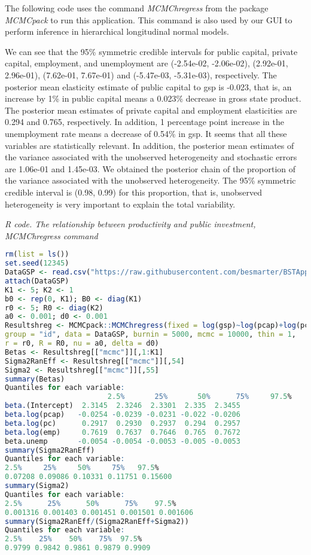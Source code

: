 The following code uses the command \textit{MCMChregress} from the package \textit{MCMCpack} to run this application. This command is also used by our GUI to perform inference in hierarchical longitudinal normal models.

We can see that the 95\% symmetric credible intervals for public capital, private capital, employment, and unemployment are (-2.54e-02, -2.06e-02), (2.92e-01, 2.96e-01), (7.62e-01, 7.67e-01) and (-5.47e-03, -5.31e-03), respectively. The posterior mean elasticity estimate of public capital to gsp is -0.023, that is, an increase by 1\% in public capital means a 0.023\% decrease in gross state product. The posterior mean estimates of private capital and employment elasticities are 0.294 and 0.765, respectively. In addition, 1 percentage point increase in the unemployment rate means a decrease of 0.54\% in gsp. It seems that all these variables are statistically relevant. In addition, the posterior mean estimates of the variance associated with the unobserved heterogeneity and stochastic errors are 1.06e-01 and 1.45e-03. We obtained the posterior chain of the proportion of the variance associated with the unobserved heterogeneity. The 95\% symmetric credible interval is (0.98, 0.99) for this proportion, that is, unobserved heterogeneity is very important to explain the total variability.

\begin{tcolorbox}[enhanced,width=4.67in,center upper,
	fontupper=\large\bfseries,drop shadow southwest,sharp corners]
	\textit{R code. The relationship between productivity and public investment, MCMChregress command}
	\begin{VF}
		\begin{lstlisting}[language=R]
rm(list = ls())
set.seed(12345)
DataGSP <- read.csv("https://raw.githubusercontent.com/besmarter/BSTApp/refs/heads/master/DataApp/8PublicCap.csv", sep = ",", header = TRUE, quote = "")
attach(DataGSP)
K1 <- 5; K2 <- 1
b0 <- rep(0, K1); B0 <- diag(K1)
r0 <- 5; R0 <- diag(K2)
a0 <- 0.001; d0 <- 0.001
Resultshreg <- MCMCpack::MCMChregress(fixed = log(gsp)~log(pcap)+log(pc)+log(emp)+unemp, random = ~1, 
group = "id", data = DataGSP, burnin = 5000, mcmc = 10000, thin = 1,
r = r0, R = R0, nu = a0, delta = d0)
Betas <- Resultshreg[["mcmc"]][,1:K1]
Sigma2RanEff <- Resultshreg[["mcmc"]][,54]
Sigma2 <- Resultshreg[["mcmc"]][,55]
summary(Betas)
Quantiles for each variable:
						2.5%       25%       50%      75%     97.5%
beta.(Intercept)  2.3145  2.3246  2.3301  2.335  2.3455
beta.log(pcap)   -0.0254 -0.0239 -0.0231 -0.022 -0.0206
beta.log(pc)      0.2917  0.2930  0.2937  0.294  0.2957
beta.log(emp)     0.7619  0.7637  0.7646  0.765  0.7672
beta.unemp       -0.0054 -0.0054 -0.0053 -0.005 -0.0053
summary(Sigma2RanEff)
Quantiles for each variable:
2.5%     25%     50%     75%   97.5% 
0.07208 0.09086 0.10331 0.11751 0.15600 
summary(Sigma2)
Quantiles for each variable:
2.5%      25%      50%      75%    97.5% 
0.001316 0.001403 0.001451 0.001501 0.001606 
summary(Sigma2RanEff/(Sigma2RanEff+Sigma2))
Quantiles for each variable:
2.5%    25%    50%    75%  97.5% 
0.9799 0.9842 0.9861 0.9879 0.9909
\end{lstlisting}
	\end{VF}
\end{tcolorbox}

